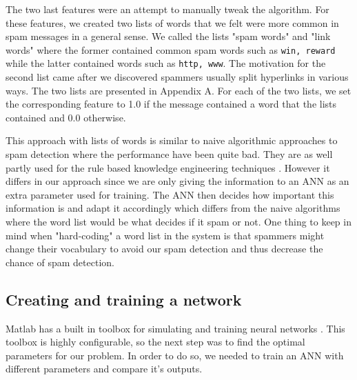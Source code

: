    The two last features were an attempt to manually tweak the algorithm.
    For these features, we created two lists of words that we felt were more
    common in spam messages in a general sense. We called the lists "spam
    words" and "link words" where the former contained common spam words such
    as \texttt{win, reward} while the latter contained words such as
    \texttt{http, www}. The motivation for the second list came after we
    discovered spammers usually split hyperlinks in various ways.
    The two lists are presented in Appendix A. For each of the
    two lists, we set the corresponding feature to 1.0 if the
    message contained a word that the lists contained and 0.0 otherwise.
	
	This approach with lists of words is similar to naive algorithmic approaches 
	to spam detection where the performance have been quite bad. They are as well 
	partly used for the rule based knowledge engineering techniques \cite{machine-learning-methods-spam}.
	However it differs in our approach since we are only giving the information to an ANN as an extra parameter
	used for training. The ANN then decides how important this information is and adapt it accordingly
	which differs from the naive algorithms where the word list would be what decides if it spam or not.
    One thing to keep in mind when "hard-coding" a word list in the system is
    that spammers might change their vocabulary to avoid our spam detection and
    thus decrease the chance of spam detection.    
  \subsection{Creating and training a network}


    Matlab has a built in toolbox for simulating and training neural networks
    \cite{matlab-nn}. 
    This toolbox is highly configurable, so the next step was to find the
    optimal parameters for our problem. In order to do so, we needed to train
    an ANN with different parameters and compare it's outputs. 
    
